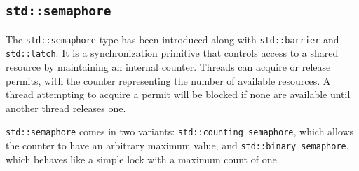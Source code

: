 \documentclass[../main]{subfiles}
\begin{document}
\subsection{\texttt{std::semaphore}}
    The \texttt{std::semaphore} type has been introduced along with \texttt{std::barrier}
and \texttt{std::latch}. It is a synchronization primitive that controls access to a shared
resource by maintaining an internal counter. Threads can acquire or release permits,
with the counter representing the number of available resources. A thread attempting
to acquire a permit will be blocked if none are available until another thread releases one.

    \texttt{std::semaphore} comes in two variants: \texttt{std::counting\_semaphore}, which
allows the counter to have an arbitrary maximum value, and \texttt{std::binary\_semaphore},
which behaves like a simple lock with a maximum count of one.
\end{document}
